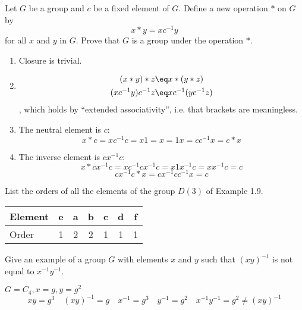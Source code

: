 \begin{exercise}
    Let \(G\) be a group and \(c\) be a fixed element of \(G\). Define a new operation \(*\) on \(G\) by
    \[x * y = xc^{ - 1}y\]
    for all \(x\) and \(y\) in \(G\). Prove that \(G\) is a group under the operation \(*\).
\end{exercise}
\begin{solution}\itemfix
    \begin{enumerate}
        \item Closure is trivial.
        \item \begin{align*}
                  (x * y) * z             & \eq x * (y * z)             \\
                  (xc^{ - 1}y) c^{ - 1} z & \eq xc^{ - 1} (yc^{ - 1} z) \\
              \end{align*}
              , which holds by ``extended associativity'', i.e. that brackets are meaningless.
        \item The neutral element is \(c\):
              \[x * c = x c^{ - 1}c = x 1 = x = 1 x = c c^{ - 1} x = c * x\]
        \item The inverse element is \(c x^{ - 1} c\):
              \[x * c x^{ - 1} c = x c^{ - 1} c x^{ - 1} c = x 1 x^{ - 1} c = x x^{ - 1} c = c\]
              \[c x^{ - 1} c * x = c x^{ - 1} c c^{ - 1} x = c\]
    \end{enumerate}
\end{solution}

\begin{exercise}
    List the orders of all the elements of the group \(D(3)\) of Example 1.9.
\end{exercise}
\begin{solution}\itemfix
    \begin{center}
        \begin{tabular}{l|C|C|C|C|C|C}
            Element & e & a & b & c & d & f \\ \hline
            Order   & 1 & 2 & 2 & 1 & 1 & 1
        \end{tabular}
    \end{center}
\end{solution}

\begin{exercise}
    Give an example of a group \(G\) with elements \(x\) and \(y\) such that \((xy)^{ - 1}\) is not equal to \(x^{ - 1}y^{ - 1}\).
\end{exercise}
\begin{solution}
    \(G = C_4, x = g, y = g^2\)
    \[xy = g^3 \quad (xy)^{ - 1} = g \quad x^{ - 1} = g^3 \quad y^{ - 1} = g^2 \quad x^{ - 1}y^{ - 1} = g^2 \neq (xy)^{ - 1}\]
\end{solution}

